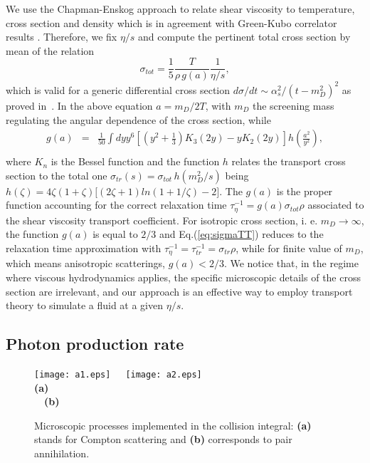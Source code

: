 \documentclass[aps,prc,a4paper,nofootinbib,
preprintnumbers,superscriptaddress,twocolumn,showpacs,showkeys]{revtex4}
\begin{document}
We use the Chapman-Enskog \cite{CE} approach to relate shear viscosity to temperature, cross section and density
which is in agreement with Green-Kubo correlator results \cite{Plumari:2012ep}.
Therefore, we fix $\eta/s$ and compute the pertinent total cross section by mean of the relation
\begin{equation}
\sigma_{tot}=\frac{1}{5}\frac{T}{\rho \, g(a)} \frac{1}{\eta/s}, 
\label{eq:sigmaTT}
\end{equation}
which is valid for a generic differential cross section $d\sigma/dt \sim \alpha_s^2/(t-m_D^2)^2$
as proved in~\cite{Plumari:2012ep}.
In the above equation $a=m_D/2T$, with $m_D$ the screening mass regulating the angular dependence
of the cross section, while  
\begin{eqnarray}
g(a)&=&\frac{1}{50}\! \int\!\! dyy^6
\left[ (y^2{+}\frac{1}{3})K_3(2 y){-}yK_2(2y)\right]\!
h\left(\frac{a^2}{y^2}\right),\nonumber\\
&&
\label{g_CE}
\end{eqnarray}
where $K_n$ is the Bessel function and the function $h$ relates the transport cross section to the total one $\sigma_{tr}(s)= \sigma_{tot} \, h(m_{D}^2/s)$
being  $h(\zeta)=4 \zeta ( 1 + \zeta ) \big[ (2 \zeta + 1) ln(1 + 1/\zeta) - 2 \big ]$. 
The $g(a)$ is the proper function accounting for
the correct relaxation time $\tau_{\eta}^{-1}=g(a) \sigma_{tot} \rho$ associated
to the shear viscosity transport coefficient. 
For isotropic cross section, i. e. $m_D\to \infty$, the function $g(a)$ is equal to $2/3$
and Eq.(\ref{eq:sigmaTT}) reduces to the relaxation time approximation
with $\tau^{-1}_{\eta} =\tau^{-1}_{tr} = \sigma_{tr} \rho$, while for finite value of $m_D$, which means anisotropic scatterings, $g(a)<2/3$.
We notice that, in the regime where viscous hydrodynamics applies, the specific microscopic details of the cross section are irrelevant, and our approach is an effective way to employ transport theory to simulate a fluid at 
a given $\eta/s$.






\subsection{Photon production rate}
\begin{figure*}[t!]
\begin{center}
\texttt{[image: a1.eps]}~~~\texttt{[image: a2.eps]}\\
{\bf(a)}~~~~~~~~~~~~~~~~~~~~~~~~~~~~~~~~~~~~~~~~~~~~~~~~~~~~~~~~~~~{\bf(b)}
\caption{\label{Fig:a1}Microscopic processes implemented in the collision integral:  
{\bf(a)} stands for Compton scattering and {\bf(b)} corresponds to pair annihilation.}
\end{center}
\end{figure*}
\end{document}
